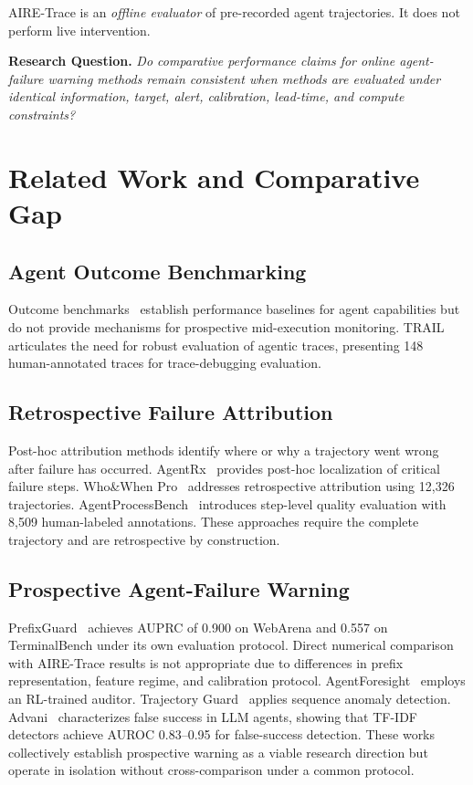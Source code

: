 \documentclass[conference]{IEEEtran}
\begin{document}
AIRE-Trace is an \textit{offline evaluator} of pre-recorded agent
trajectories. It does not perform live intervention.

\textbf{Research Question.} \textit{Do comparative performance claims
for online agent-failure warning methods remain consistent when methods
are evaluated under identical information, target, alert, calibration,
lead-time, and compute constraints?}

\section{Related Work and Comparative Gap}

\subsection{Agent Outcome Benchmarking}
Outcome benchmarks~\cite{b1,b2,b3} establish performance baselines for
agent capabilities but do not provide mechanisms for prospective
mid-execution monitoring. TRAIL~\cite{b4} articulates the need for
robust evaluation of agentic traces, presenting 148 human-annotated
traces for trace-debugging evaluation.

\subsection{Retrospective Failure Attribution}
Post-hoc attribution methods identify where or why a trajectory went
wrong after failure has occurred. AgentRx~\cite{b5} provides post-hoc
localization of critical failure steps. Who\&When Pro~\cite{b6}
addresses retrospective attribution using 12{,}326 trajectories.
AgentProcessBench~\cite{b11} introduces step-level quality evaluation
with 8{,}509 human-labeled annotations. These approaches require the
complete trajectory and are retrospective by construction.

\subsection{Prospective Agent-Failure Warning}
PrefixGuard~\cite{b7} achieves AUPRC of 0.900 on WebArena and 0.557 on
TerminalBench under its own evaluation protocol. Direct numerical
comparison with AIRE-Trace results is not appropriate due to differences
in prefix representation, feature regime, and calibration protocol.
AgentForesight~\cite{b8} employs an RL-trained auditor. Trajectory
Guard~\cite{b9} applies sequence anomaly detection. Advani~\cite{b10}
characterizes false success in LLM agents, showing that TF-IDF detectors
achieve AUROC 0.83--0.95 for false-success detection. These works
collectively establish prospective warning as a viable research direction
but operate in isolation without cross-comparison under a common
protocol.
\end{document}
